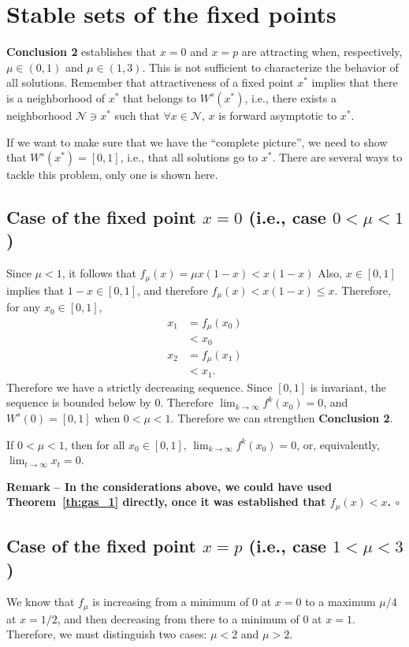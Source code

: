 \documentclass[12pt]{article}
\theoremstyle{plain}
\newenvironment{remark}{\vskip0.2cm\par\noindent\begin{small}\bf Remark\,\,\rm --}{\hfill{$\circ$}\end{small}\par\vskip0.25cm}
\begin{document}
\section{Stable sets of the fixed points}
{\bf Conclusion 2} establishes that $x=0$ and $x=p$ are attracting when, respectively, $\mu\in(0,1)$ and $\mu\in(1,3)$. This is not sufficient to characterize the behavior of all solutions. Remember that attractiveness of a fixed point $x^*$ implies that there is a neighborhood of $x^*$ that belongs to $W^s(x^*)$, i.e., there exists 
a neighborhood $\mathcal{N}\ni x^*$ such that $\forall x\in\mathcal{N}$, $x$ is forward asymptotic to $x^*$.

If we want to make sure that we have the ``complete picture'', we need to show that $W^s(x^*)=[0,1]$, i.e., that all solutions go to $x^*$. There are several ways to tackle this problem, only one is shown here.

\subsection{Case of the fixed point $x=0$ (i.e., case $0<\mu<1$)}
Since $\mu<1$, it follows that $f_\mu(x)=\mu x(1-x)<x(1-x)$ Also, $x\in[0,1]$ implies that $1-x\in[0,1]$, and therefore $f_\mu(x)<x(1-x)\leq x$. Therefore, for any $x_0\in[0,1]$,
\begin{align*}
x_1 &= f_\mu(x_0) \\
&< x_0 \\
x_2 &= f_\mu(x_1) \\
& < x_1.
\end{align*}
Therefore we have a strictly decreasing sequence. Since $[0,1]$ is invariant, the sequence is bounded below by $0$. Therefore $\lim_{k\to\infty}f^k(x_0)=0$, and $W^s(0)=[0,1]$ when $0<\mu<1$. Therefore we can strengthen {\bf Conclusion 2}.

 If $0<\mu<1$, then for all $x_0\in[0,1]$, $\lim_{k\to\infty}f^k(x_0)=0$, or, equivalently, $\lim_{t\to\infty}x_t=0$.

\begin{remark}
In the considerations above, we could have used Theorem~\ref{th:gas_1} directly, once it was established that $f_\mu(x)<x$.
\end{remark}
 

\subsection{Case of the fixed point $x=p$ (i.e., case $1<\mu<3$)}
We know that $f_\mu$ is increasing from a minimum of 0 at $x=0$ to a maximum $\mu/4$ at $x=1/2$, and then decreasing from there to a minimum of 0 at $x=1$. Therefore, we must distinguish two cases: $\mu<2$ and $\mu>2$.
\end{document}
